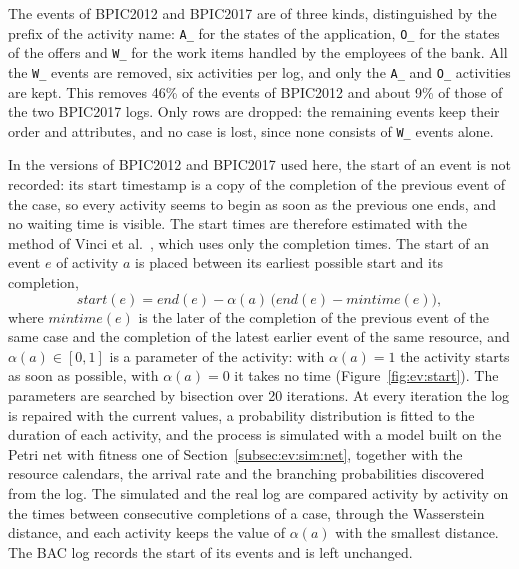 The events of BPIC2012 and BPIC2017 are of three kinds, distinguished by the
prefix of the activity name: \texttt{A\_} for the states of the application,
\texttt{O\_} for the states of the offers and \texttt{W\_} for the work items
handled by the employees of the bank. All the \texttt{W\_} events are
removed, six activities per log, and only the \texttt{A\_} and \texttt{O\_}
activities are kept. This removes 46\% of the events of BPIC2012 and about
9\% of those of the two BPIC2017 logs. Only rows are dropped: the remaining
events keep their order and attributes, and no case is lost, since none
consists of \texttt{W\_} events alone.

In the versions of BPIC2012 and BPIC2017 used here, the start of an event is
not recorded: its start timestamp is a copy of the completion of the previous
event of the case, so every activity seems to begin as soon as the previous
one ends, and no waiting time is visible. The start times are therefore
estimated with the method of Vinci et al.~\cite{vinci2026healthcare}, which
uses only the completion times. The start of an event $e$ of activity $a$ is
placed between its earliest possible start and its completion,
\begin{equation}
  \mathit{start}(e) = \mathit{end}(e) - \alpha(a)\,
  \bigl( \mathit{end}(e) - \mathit{mintime}(e) \bigr),
  \label{eq:ev:start}
\end{equation}
where $\mathit{mintime}(e)$ is the later of the completion of the previous
event of the same case and the completion of the latest earlier event of the
same resource, and $\alpha(a) \in [0, 1]$ is a parameter of the activity:
with $\alpha(a) = 1$ the activity starts as soon as possible, with
$\alpha(a) = 0$ it takes no time (Figure~\ref{fig:ev:start}). The parameters
are searched by bisection over 20 iterations. At every iteration the log is
repaired with the current values, a probability distribution is fitted to the
duration of each activity, and the process is simulated with a model built on
the Petri net with fitness one of Section~\ref{subsec:ev:sim:net}, together
with the resource calendars, the arrival rate and the branching
probabilities discovered from the log. The simulated and the real log are
compared activity by activity on the times between consecutive completions
of a case, through the Wasserstein distance, and each activity keeps the
value of $\alpha(a)$ with the smallest distance. The BAC log records the
start of its events and is left unchanged.

